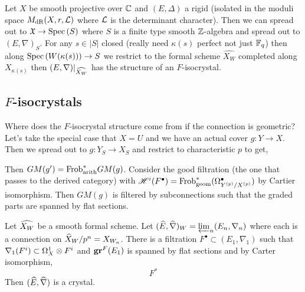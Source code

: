 \documentclass[12pt]{article}
\begin{document}
\begin{theorem}[E. Grocdenz, 2018]
Let $X$ be smooth projective over $\mathbb{C}$ and $(E, \Delta)$ a rigid (isolated in the moduli space $M_{\mathrm{dR}}(X, r, \mathcal{L})$ where $\mathcal{L}$ is the determinant character). Then we can spread out to $\mathfrak{X} \to \mathrm{Spec}\left( S \right)$ where $S$ is a finite type smooth $\mathbb{Z}$-algebra and spread out to $(E, \nabla)_S$. For any $s \in |S|$ closed (really need $\kappa(s)$ perfect not just $\mathbb{F}_q$) then along $\mathrm{Spec}\left( W(\kappa(s)) \right) \to S$ we restrict to the formal scheme $\widehat{X_W}$ completed along $X_{\kappa(s)}$ then $(E, \nabla)|_{\widehat{X_W}}$ has the structure of an $F$-isocrystal.
\end{theorem}

\subsection{$F$-isocrystals}

Where does the $F$-isocrystal structure come from if the connection is geometric? Let's take the special case that $X = U$ and we have an actual cover $g : Y \to X$. Then we spread out to $g : Y_S \to X_S$ and restrict to characteristic $p$ to get,
\begin{center}
\end{center}
Then $GM(g') = \mathrm{Frob}_{\text{arith}}^* GM(g)$. Consider the good filtration (the one that passes to the derived category) with $\mathscr{H}^i(F^\bullet) = \mathrm{Frob}_{\text{geom}}^* (\Omega^\bullet_{Y^{(p)}/X^{(p)}})$ by Cartier isomorphism. Then $GM(g)$ is filtered by subconnections such that the graded parts are spanned by flat sections.

\begin{defn}
Let $\widehat{X_W}$ be a smooth formal scheme. Let $(\widehat{E}, \widehat{\nabla})_W = \varprojlim_n (E_n, \nabla_n)$ where each is a connection on $\widehat{X}_W / p^n = X_{W_n}$. There is a filtration $F^\bullet \subset (E_1, \nabla_1)$ such that $\nabla_1(F^i) \subset \Omega_X^1 \otimes F^i$ and $\mathbf{gr}^F(E_1)$ is spanned by flat sections and by Carter isomorphism,
\[ F^* \]
Then $(\widehat{E}, \widehat{\nabla})$ is a crystal.
\end{defn}
\end{document}
